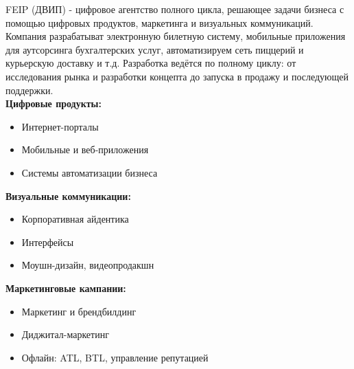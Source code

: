 FEIP (ДВИП) - цифровое агентство полного цикла, решающее задачи бизнеса с помощью цифровых продуктов, 
маркетинга и визуальных коммуникаций. \\
Компания разрабатыват электронную билетную систему, мобильные приложения 
для аутсорсинга бухгалтерских услуг, автоматизируем сеть пиццерий и курьерскую доставку и т.д.
Разработка ведётся по полному циклу: от исследования рынка и разработки концепта до запуска в продажу и 
последующей поддержки. \\

\textbf{Цифровые продукты:}
\begin{itemize}
    \item Интернет-порталы
    \item Мобильные и веб-приложения
    \item Системы автоматизации бизнеса
\end{itemize}

\textbf{Визуальные коммуникации:}
\begin{itemize}
    \item Корпоративная айдентика
    \item Интерфейсы
    \item Моушн-дизайн, видеопродакшн
\end{itemize}

\textbf{Маркетинговые кампании:}
\begin{itemize}
    \item Маркетинг и брендбилдинг
    \item Диджитал-маркетинг
    \item Офлайн: ATL, BTL, управление репутацией
\end{itemize}
